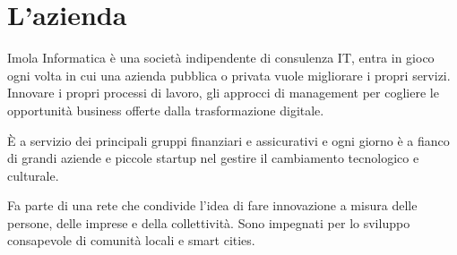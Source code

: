 \section{L'azienda}\label{sec:l'azienda}

Imola Informatica è una società indipendente di consulenza IT, entra in gioco ogni volta in cui una azienda pubblica o privata vuole migliorare i propri servizi.
Innovare i propri processi di lavoro, gli approcci di management per cogliere le opportunità business offerte dalla trasformazione digitale.

È a servizio dei principali gruppi finanziari e assicurativi e ogni giorno è a fianco di grandi aziende e piccole startup nel gestire il cambiamento tecnologico e culturale.

Fa parte di una rete che condivide l’idea di fare innovazione a misura delle persone, delle imprese e della collettività.
Sono impegnati per lo sviluppo consapevole di comunità locali e smart cities.
